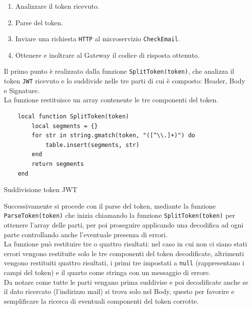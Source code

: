 \begin{enumerate}
	\item Analizzare il token ricevuto.
	\item Parse del token.
	\item Inviare una richiesta \texttt{HTTP} al microservizio \texttt{CheckEmail}.
	\item Ottenere e inoltrare al Gateway il codice di risposta ottenuto.
\end{enumerate}

Il primo punto è realizzato dalla funzione \texttt{SplitToken(token)}, che analizza il token \texttt{JWT} ricevuto e lo suddivide nelle tre parti di cui è composto: Header, Body e Signature.\\
La funzione restituisce un array contenente le tre componenti del token.

\begin{algorithm}
\centering
\begin{verbatim}
	local function SplitToken(token)
		local segments = {}
		for str in string.gmatch(token, "([^\\.]+)") do
			table.insert(segments, str)
		end
		return segments
	end
\end{verbatim}
\caption{Suddivisione token JWT}\label{alg:splittoken}
\end{algorithm}

Successivamente si procede con il parse del token, mediante la funzione \texttt{ParseToken(token)} che inizia chiamando la funzione \texttt{SplitToken(token)}
per ottenere l'array delle parti, per poi proseguire applicando una decodifica ad ogni parte controllando anche l'eventuale presenza di errori.\\
La funzione può restituire tre o quattro risultati: nel caso in cui non ci siano stati errori vengono restituite solo le tre componenti del token decodificate, altrimenti 
vengono restituiti quattro risultati, i primi tre impostati a \texttt{null} (rappresentano i campi del token) e il quarto come stringa con un messaggio di errore.\\
Da notare come tutte le parti vengano prima suddivise e poi decodificate anche se il dato ricercato (l'indirizzo mail) si trova solo nel Body, questo per favorire e semplificare 
la ricerca di eventuali componenti del token corrotte.

